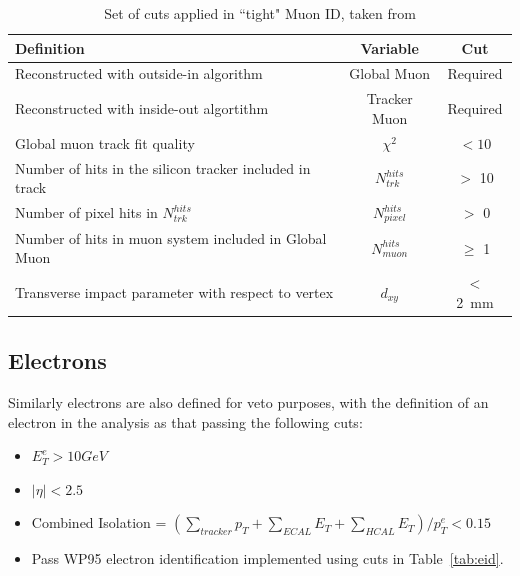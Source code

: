 \begin{table}[htbp]
\centering
\begin{tabular}{ m{8.9cm}  c  c }
\hline
\hline
 \centering Definition & Variable & Cut \\
\hline
\hline
 Reconstructed with outside-in algorithm & Global Muon & Required\\
Reconstructed with inside-out algortithm & Tracker Muon & Required\\
 Global muon track fit quality & $\chi^{2}$ & $< 10$ \\ 
Number of hits in the silicon tracker included in track & $N^{hits}_{\textit{trk}}$ &$ >$ 10\\
Number of pixel hits in $N^{hits}_{trk}$ & $N^{hits}_{\textit{pixel}}$ & $ > $ 0\\
Number of hits in muon system included in Global Muon & $N^{hits}_{\textit{muon}}$ & $\geq $ 1\\
Transverse impact parameter with respect to vertex & $d_{xy}$ & $< $ 2~mm\\
\hline
\end{tabular}
\caption{\label{tab:muid} Set of cuts applied in ``tight" Muon ID, taken from \cite{MUO-10-002}}
\end{table}



\subsection{Electrons}
Similarly electrons are also defined for veto purposes, with the definition of an electron in the analysis as that passing the following cuts:

\begin{itemize}
\item $E^{e}_{T} > 10 GeV$
\item $|\eta| < 2.5$
\item Combined Isolation = $(\sum_{tracker} p_{T} + \sum_{ECAL}E_{T} + \sum_{HCAL}E_{T})/p^{e}_{T} < 0.15$
\item Pass WP95 electron identification implemented using cuts in Table~\ref{tab:eid}.
\end{itemize}


